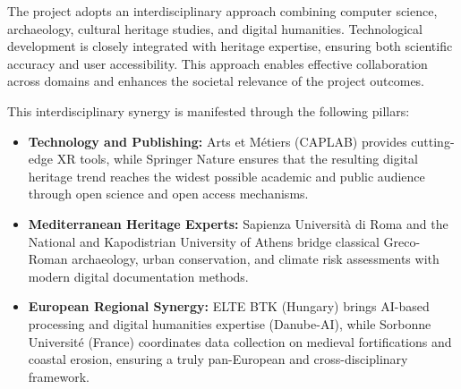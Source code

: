 \noindent The project adopts an interdisciplinary approach combining computer science, archaeology, cultural heritage studies, and digital humanities.
\noindent Technological development is closely integrated with heritage expertise, ensuring both scientific accuracy and user accessibility. This approach enables effective collaboration across domains and enhances the societal relevance of the project outcomes.

\vspace{1em}
\noindent This interdisciplinary synergy is manifested through the following pillars:
\begin{itemize}
    \item \textbf{Technology and Publishing:} Arts et Métiers (CAPLAB) provides cutting-edge XR tools, while Springer Nature ensures that the resulting digital heritage trend reaches the widest possible academic and public audience through open science and open access mechanisms.
    \item \textbf{Mediterranean Heritage Experts:} Sapienza Università di Roma and the National and Kapodistrian University of Athens bridge classical Greco-Roman archaeology, urban conservation, and climate risk assessments with modern digital documentation methods.
    \item \textbf{European Regional Synergy:} ELTE BTK (Hungary) brings AI-based processing and digital humanities expertise (Danube-AI), while Sorbonne Université (France) coordinates data collection on medieval fortifications and coastal erosion, ensuring a truly pan-European and cross-disciplinary framework.
\end{itemize}